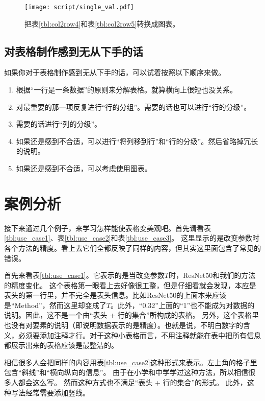 \documentclass{article}
\newcommand{\Tref}[1]{表\ref{#1}}
\begin{document}
\begin{figure}[h]
    \centering
    \texttt{[image: script/single\_val.pdf]}
    \caption{把\Tref{tbl:col2row4}和\Tref{tbl:col2row5}转换成图表。}
    \label{fig:single_val}
\end{figure}


\subsection{对表格制作感到无从下手的话}
如果你对于表格制作感到无从下手的话，可以试着按照以下顺序来做。
\begin{enumerate}
    \setlength{\itemsep}{-0.5ex}
    \item 根据“一行是一条数据”的原则来分解表格。就算横向上很短也没关系。
    \item 对最重要的那一项反复进行“行的分组”。需要的话也可以进行“行的分级”。
    \item 需要的话进行“列的分级”。
    \item 如果还是感到不合适，可以进行“将列移到行”和“行的分级”。然后省略掉冗长的说明。
    \item 如果还是感到不合适，可以考虑使用图表。
\end{enumerate}


\section{案例分析}
接下来通过几个例子，来学习怎样能使表格变美观吧。首先请看\Tref{tbl:use_case1}、\Tref{tbl:use_case2}和\Tref{tbl:use_case3}。
这里显示的是改变参数时各个方法的精度。看上去它们全都反映了同样的内容，但其实这里面包含了常见的错误。

首先来看\Tref{tbl:use_case1}。它表示的是当改变参数$T$时，ResNet50和我们的方法的精度变化。
这个表格第一眼看上去好像很工整，但是仔细看就会发现，本应是表头的第一行里，并不完全是表头信息。比如ResNet50的上面本来应该是“Method”，然而这里却变成了$T$。此外，“0.32”上面的“1”也不能成为对数据的说明。因此，这不是一个由“表头 + 行的集合”所构成的表格。
另外，这个表格里也没有对要素的说明（即说明数据表示的是精度）。也就是说，不明白数字的含义，必须要添加注释才行。对于这种小表格而言，不用注释就能在表中把所有信息都展示出来的表格应该是最整洁的。

相信很多人会把同样的内容用\Tref{tbl:use_case2}这种形式来表示。左上角的格子里包含“斜线”和“横向纵向的信息”。
由于在小学和中学学过这种方法，所以相信很多人都会这么写。
然而这种方式也不满足“表头 + 行的集合”的形式。
此外，这种写法经常需要添加竖线。
\end{document}
